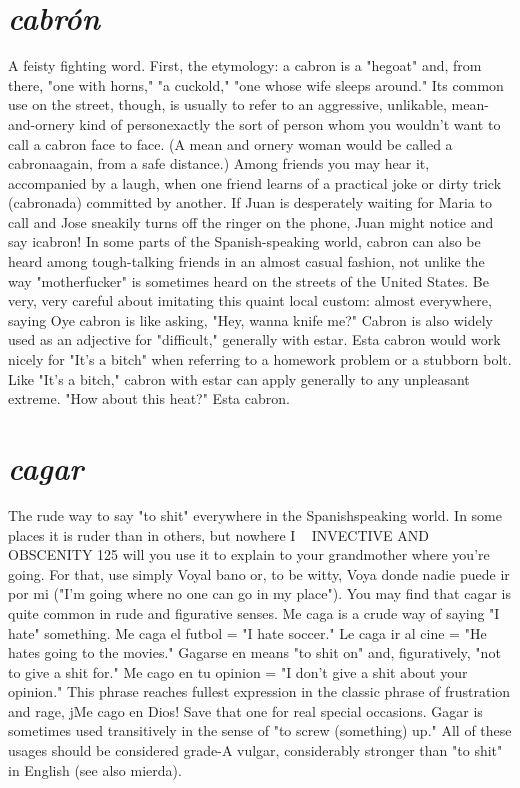 \documentclass[14pt,a4paper,oneside]{memoir}
\begin{document}
\section{\emph{cabrón}}

A feisty fighting word. First, the etymology: a cabron is a "hegoat" and, from there, "one with horns," "a cuckold," "one whose wife
sleeps around." Its common use on the street, though, is usually to
refer to an aggressive, unlikable, mean-and-ornery kind of personexactly the sort of person whom you wouldn't want to call a cabron
face to face. (A mean and ornery woman would be called a cabronaagain, from a safe distance.) Among friends you may hear it, accompanied by a laugh, when one friend learns of a practical joke or dirty trick
(cabronada) committed by another. If Juan is desperately waiting for
Maria to call and Jose sneakily turns off the ringer on the phone, Juan
might notice and say icabron! In some parts of the Spanish-speaking
world, cabron can also be heard among tough-talking friends in an almost casual fashion, not unlike the way "motherfucker" is sometimes
heard on the streets of the United States. Be very, very careful about
imitating this quaint local custom: almost everywhere, saying Oye cabron is like asking, "Hey, wanna knife me?" Cabron is also widely
used as an adjective for "difficult," generally with estar. Esta cabron
would work nicely for "It's a bitch" when referring to a homework
problem or a stubborn bolt. Like "It's a bitch," cabron with estar can
apply generally to any unpleasant extreme. "How about this heat?"
Esta cabron.

\section{\emph{cagar}}

The rude way to say "to shit" everywhere in the Spanishspeaking world. In some places it is ruder than in others, but nowhere
I ~
INVECTIVE AND OBSCENITY 125
will you use it to explain to your grandmother where you're going. For
that, use simply Voyal bano or, to be witty, Voya donde nadie puede
ir por mi ("I'm going where no one can go in my place").
You may find that cagar is quite common in rude and figurative senses. Me caga is a crude way of saying "I hate" something. Me
caga el futbol = "I hate soccer." Le caga ir al cine = "He hates going
to the movies." Gagarse en means "to shit on" and, figuratively, "not
to give a shit for." Me cago en tu opinion = "I don't give a shit about
your opinion." This phrase reaches fullest expression in the classic
phrase of frustration and rage, jMe cago en Dios! Save that one for real
special occasions. Gagar is sometimes used transitively in the sense of
"to screw (something) up." All of these usages should be considered
grade-A vulgar, considerably stronger than "to shit" in English (see
also mierda).
\end{document}
